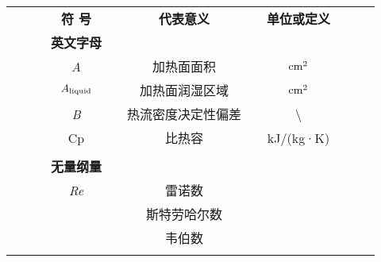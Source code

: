 \begin{denotation}
	\vspace{-20pt}
\begin{center}
\begin{table}[htbp]
	\centering
	\begin{tabular}{rrrcccccccccccccrrr}
		\toprule
		&       &       & \multicolumn{3}{c}{\textbf{符  号}} &       & \multicolumn{4}{c}{\textbf{代表意义}} &       & \multicolumn{4}{c}{\textbf{单位或定义}} &       &       &  \\
		&       &       & \multicolumn{3}{c}{\textbf{英文字母}} &       & \multicolumn{4}{c}{}          &       & \multicolumn{4}{c}{}          &       &       &  \\
		&       &       & \multicolumn{3}{c}{\textit{A}} &       & \multicolumn{4}{c}{加热面面积}     &       & \multicolumn{4}{c}{$\rm{cm^2}$}       &       &       &  \\
		&       &       & \multicolumn{3}{c}{$A_{\rm{liquid}}$} &       & \multicolumn{4}{c}{加热面润湿区域}   &       & \multicolumn{4}{c}{$\rm{cm^2}$}       &       &       &  \\
		&       &       & \multicolumn{3}{c}{\textit{B}} &       & \multicolumn{4}{c}{热流密度决定性偏差} &       & \multicolumn{4}{c}{\textbackslash{}} &       &       &  \\
		&       &       & \multicolumn{3}{c}{Cp} &       & \multicolumn{4}{c}{比热容}       &       & \multicolumn{4}{c}{kJ/(kg·K)} &       &       &  \\
		\multicolumn{4}{c}{}          &       &
		\multicolumn{4}{c}{}          &       & \multicolumn{4}{c}{}          &       &       &  \\
		&       &       & \multicolumn{3}{c}{\textbf{无量纲量}} &       & \multicolumn{4}{c}{}          &       & \multicolumn{4}{c}{}          &       &       &  \\
		&       &       & \multicolumn{3}{c}{\textit{Re}} &       & \multicolumn{4}{c}{雷诺数}       &       & \multicolumn{4}{c}{}          &       &       &  \\
		&       &       & \multicolumn{3}{c}{}  &       & \multicolumn{4}{c}{斯特劳哈尔数}    &       & \multicolumn{4}{c}{}          &       &       &  \\
		&       &       & \multicolumn{3}{c}{}  &       & \multicolumn{4}{c}{韦伯数}       &       & \multicolumn{4}{c}{}          &       &       &  \\
		&       &       & \multicolumn{3}{c}{}  &       & \multicolumn{4}{c}{}          &       & \multicolumn{4}{c}{}          &       &       &  \\

\end{tabular}
\end{table}
\end{center}
\end{denotation}

